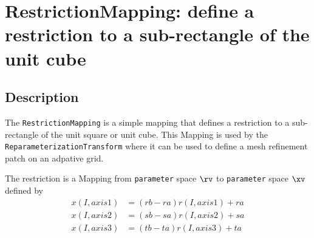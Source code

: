 \section{RestrictionMapping: define a restriction to a sub-rectangle of the unit cube}

\subsection{Description}

The {\tt RestrictionMapping} is a simple mapping that defines a restriction to
a sub-rectangle of the unit square or unit cube.
This Mapping is used by the {\tt ReparameterizationTransform} where it can be used
to define a mesh refinement patch on an adpative grid.

The restriction is a Mapping from {\tt parameter} space $\rv$ to {\tt parameter} space
$\xv$ defined by 
\begin{align*}
    x(I,axis1) &= (rb-ra) r(I,axis1)+ra \\
    x(I,axis2) &= (sb-sa) r(I,axis2)+sa \\
    x(I,axis3) &= (tb-ta) r(I,axis3)+ta  
\end{align*}



